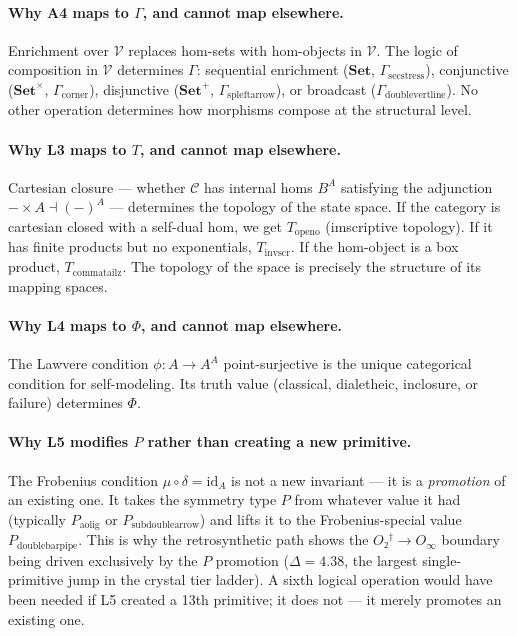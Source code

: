 \documentclass[12pt,a4paper]{article}
\begin{document}
\paragraph{Why A4 maps to $\Gamma$, and cannot map elsewhere.}
Enrichment over $\mathcal{V}$ replaces hom-sets with hom-objects in $\mathcal{V}$. The logic of composition in $\mathcal{V}$ determines $\Gamma$: sequential enrichment ($\mathbf{Set}$, $\Gamma_{\text{secstress}}$), conjunctive ($\mathbf{Set}^\times$, $\Gamma_{\text{corner}}$), disjunctive ($\mathbf{Set}^+$, $\Gamma_{\text{spleftarrow}}$), or broadcast ($\Gamma_{\text{doublevertline}}$). No other operation determines how morphisms compose at the structural level.

\paragraph{Why L3 maps to $T$, and cannot map elsewhere.}
Cartesian closure --- whether $\mathcal{C}$ has internal homs $B^A$ satisfying the adjunction $-\times A \dashv (-)^A$ --- determines the topology of the state space. If the category is cartesian closed with a self-dual hom, we get $T_{\text{openo}}$ (imscriptive topology). If it has finite products but no exponentials, $T_{\text{invscr}}$. If the hom-object is a box product, $T_{\text{commatailz}}$. The topology of the space is precisely the structure of its mapping spaces.

\paragraph{Why L4 maps to $\Phi$, and cannot map elsewhere.}
The Lawvere condition $\phi: A \to A^A$ point-surjective is the unique categorical condition for self-modeling. Its truth value (classical, dialetheic, inclosure, or failure) determines $\Phi$.

\paragraph{Why L5 modifies $P$ rather than creating a new primitive.}
The Frobenius condition $\mu \circ \delta = \text{id}_A$ is not a new invariant --- it is a \emph{promotion} of an existing one. It takes the symmetry type $P$ from whatever value it had (typically $P_{\text{aolig}}$ or $P_{\text{subdoublearrow}}$) and lifts it to the Frobenius-special value $P_{\text{doublebarpipe}}$. This is why the retrosynthetic path shows the $O₂^\dagger \to O_\infty$ boundary being driven exclusively by the $P$ promotion ($\Delta = 4.38$, the largest single-primitive jump in the crystal tier ladder). A sixth logical operation would have been needed if L5 created a 13th primitive; it does not --- it merely promotes an existing one.
\end{document}

